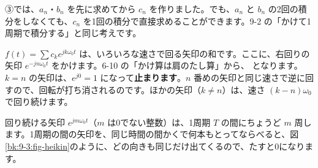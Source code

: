 \bkkokomade[反対向きに回る2本の矢印の和が $\cos$ の波になること、$c_n=\frac{a_n-jb_n}{2}$ で $a_n$・$b_n$ から $c_n$ が求められること、両側スペクトルの高さは振幅の半分であることがわかれば十分です。この先は、$c_n$ を直接計算する方法と、その使いみちです。]



\label{bk:9-3:chokusetsu}③では、$a_n$・$b_n$ を先に求めてから $c_n$ を作りました。でも、$a_n$ と $b_n$ の2回の積分をしなくても、$c_n$ を1回の積分で直接求めることができます。9-2 の「かけて1周期で積分する」と同じ考えです。

$f(t)=\sum c_ke^{jk\omega_0t}$ は、いろいろな速さで回る矢印の和です。ここに、右回りの矢印 $e^{-jn\omega_0t}$ をかけます。6-10 の「かけ算は肩のたし算」から、
となります。$k=n$ の矢印は、$e^{j0}=1$ になって\textbf{止まります}。$n$ 番めの矢印と同じ速さで逆に回すので、回転が打ち消されるのです。ほかの矢印（$k\neq n$）は、速さ $(k-n)\omega_0$ で回り続けます。

回り続ける矢印 $e^{jm\omega_0t}$（$m$ は0でない整数）は、1周期 $T$ の間にちょうど $m$ 周します。1周期の間の矢印を、同じ時間の間かくで何本もとってならべると、図\ref{bk:9-3:fig-heikin}のように、どの向きも同じだけ出てくるので、たすと0になります。

